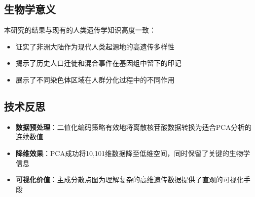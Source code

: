 \documentclass[a4paper]{article}
\begin{document}
\subsection{生物学意义}
本研究的结果与现有的人类遗传学知识高度一致：
\begin{itemize}
    \item 证实了非洲大陆作为现代人类起源地的高遗传多样性
    \item 揭示了历史人口迁徙和混合事件在基因组中留下的印记
    \item 展示了不同染色体区域在人群分化过程中的不同作用
\end{itemize}

\subsection{技术反思}
\begin{itemize}
    \item \textbf{数据预处理}：二值化编码策略有效地将离散核苷酸数据转换为适合PCA分析的连续数值
    \item \textbf{降维效果}：PCA成功将10,101维数据降至低维空间，同时保留了关键的生物学信息
    \item \textbf{可视化价值}：主成分散点图为理解复杂的高维遗传数据提供了直观的可视化手段
\end{itemize}
\end{document}
